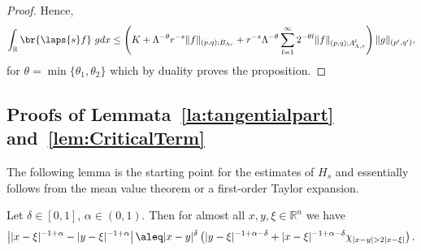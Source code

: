 \begin{proof}
Hence, 
\begin{equation*}
 \int_{\mathbb R} \br{\laps{s} f}\ g dx \leq \left(K + \Lambda ^{-\theta} r^{-s} 
 \|f\|_{(p,q);B_{\Lambda r}} + r^{-s} \Lambda^{-\theta}
  \sum_{l=1}^\infty 2^{-\theta l} 
  \|f\|_{(p,q);A^l_{\Lambda, r}} \right) \|g\|_{(p',q')},
\end{equation*}
for $\theta = \min\{\theta_1, \theta_2\}$ which by duality proves the proposition.
\end{proof}


\subsection{Proofs of Lemmata~\ref{la:tangentialpart} and~\ref{lem:CriticalTerm}}

The following lemma is the starting point for the 
estimates of $H_s$ and essentially follows from the mean value theorem or a first-order Taylor expansion.

\begin{lemma} \label{lem:MultiplierEstimate}
Let $\delta \in [0,1]$, $\alpha \in (0,1)$. Then for almost all $x,y, \xi \in \mathbb R^n$
we have
\begin{equation*}
 \left||x-\xi|^{-1+\alpha} - |y-\xi|^{-1+\alpha} \right| \aleq |x-y|^\delta 
 \left( |y-\xi|^{-1+\alpha-\delta} + |x-\xi|^{-1+\alpha-\delta} \chi_{|x-y|>2|x-\xi|}\right).
\end{equation*}
\end{lemma}

